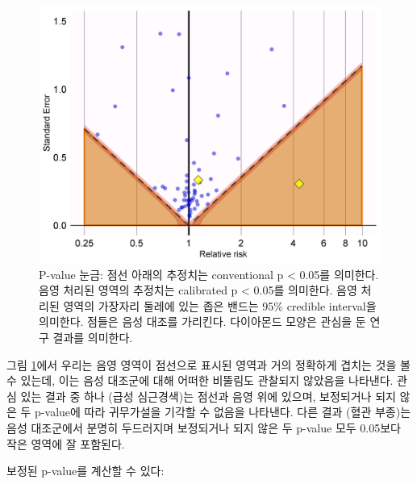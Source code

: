 \documentclass[10.5pt]{book}
\newenvironment{Shaded}{\begin{snugshade}}{\end{snugshade}}
\newcommand{\KeywordTok}[1]{\textcolor[rgb]{0.13,0.29,0.53}{\textbf{#1}}}
\newcommand{\DataTypeTok}[1]{\textcolor[rgb]{0.13,0.29,0.53}{#1}}
\newcommand{\StringTok}[1]{\textcolor[rgb]{0.31,0.60,0.02}{#1}}
\newcommand{\OperatorTok}[1]{\textcolor[rgb]{0.81,0.36,0.00}{\textbf{#1}}}
\newcommand{\NormalTok}[1]{#1}
\theoremstyle{definition}
\theoremstyle{definition}
\theoremstyle{definition}
\theoremstyle{remark}
\begin{document}
\begin{figure}

{\centering \includegraphics[width=0.7\linewidth]{images/MethodValidity/pValueCal} 

}

\caption{P-value 눈금: 점선 아래의 추정치는 conventional p < 0.05를 의미한다. 음영 처리된 영역의 추정치는 calibrated p < 0.05를 의미한다. 음영 처리된 영역의 가장자리 둘레에 있는 좁은 밴드는 95\% credible interval을 의미한다. 점들은 음성 대조를 가리킨다. 다이아몬드 모양은 관심을 둔 연구 결과를 의미한다.}\label{fig:pValueCal}
\end{figure}

그림 \ref{fig:pValueCal}에서 우리는 음영 영역이 점선으로 표시된 영역과
거의 정확하게 겹치는 것을 볼 수 있는데, 이는 음성 대조군에 대해 어떠한
비뚤림도 관찰되지 않았음을 나타낸다. 관심 있는 결과 중 하나 (급성
심근경색)는 점선과 음영 위에 있으며, 보정되거나 되지 않은 두 p-value에
따라 귀무가설을 기각할 수 없음을 나타낸다. 다른 결과 (혈관 부종)는 음성
대조군에서 분명히 두드러지며 보정되거나 되지 않은 두 p-value 모두
0.05보다 작은 영역에 잘 포함된다.

보정된 p-value를 계산할 수 있다:

\begin{Shaded}
\end{Shaded}
\end{document}
